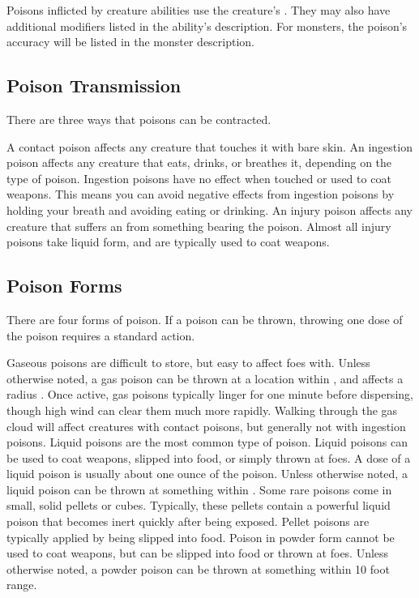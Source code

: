       Poisons inflicted by creature abilities use the creature's .
      They may also have additional modifiers listed in the ability's description.
      For monsters, the poison's accuracy will be listed in the monster description.

  \subsection{Poison Transmission}\label{Poison Transmission}\label{Transmission}

    There are three ways that poisons can be contracted.

     A contact poison affects any creature that touches it with bare skin.
     An ingestion poison affects any creature that eats, drinks, or breathes it, depending on the type of poison.
    Ingestion poisons have no effect when touched or used to coat weapons.
    This means you can avoid negative effects from ingestion poisons by holding your breath and avoiding eating or drinking.
     An injury poison affects any creature that suffers an  from something bearing the poison.
    Almost all injury poisons take liquid form, and are typically used to coat weapons.

  \subsection{Poison Forms}\label{Poison Forms}

    There are four forms of poison.
    If a poison can be thrown, throwing one dose of the poison requires a standard action.

     Gaseous poisons are difficult to store, but easy to affect foes with.
    Unless otherwise noted, a gas poison can be thrown at a location within \shortrange, and affects a \tinyarea radius .
    Once active, gas poisons typically linger for one minute before dispersing, though high wind can clear them much more rapidly.
    Walking through the gas cloud will affect creatures with contact poisons, but generally not with ingestion poisons.
     Liquid poisons are the most common type of poison.
    Liquid poisons can be used to coat weapons, slipped into food, or simply thrown at foes.
    A dose of a liquid poison is usually about one ounce of the poison.
    Unless otherwise noted, a liquid poison can be thrown at something within \shortrange.
     Some rare poisons come in small, solid pellets or cubes.
    Typically, these pellets contain a powerful liquid poison that becomes inert quickly after being exposed.
    Pellet poisons are typically applied by being slipped into food.
     Poison in powder form cannot be used to coat weapons, but can be slipped into food or thrown at foes.
    Unless otherwise noted, a powder poison can be thrown at something within 10 foot range.


